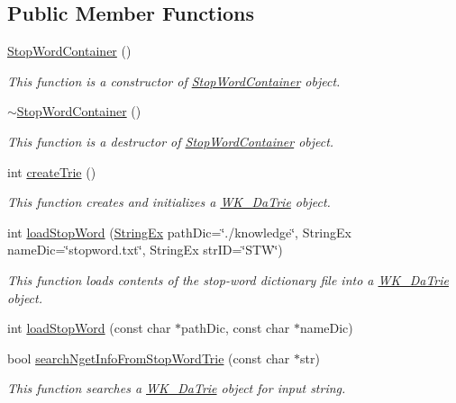 \subsection*{Public Member Functions}
\begin{CompactItemize}
\item 
\hyperlink{classkmaOrange_1_1StopWordContainer_7356fb7080dee806d788624b8a247dba}{StopWordContainer} ()
\begin{CompactList}\small\item\em This function is a constructor of \hyperlink{classkmaOrange_1_1StopWordContainer}{StopWordContainer} object. \item\end{CompactList}\item 
\hyperlink{classkmaOrange_1_1StopWordContainer_853fda3c028335f2529c57e0341f22fd}{$\sim$StopWordContainer} ()
\begin{CompactList}\small\item\em This function is a destructor of \hyperlink{classkmaOrange_1_1StopWordContainer}{StopWordContainer} object. \item\end{CompactList}\item 
int \hyperlink{classkmaOrange_1_1StopWordContainer_143f32eb2e3b314d596cbd30f7ed6cfd}{createTrie} ()
\begin{CompactList}\small\item\em This function creates and initializes a \hyperlink{classkmaOrange_1_1WK__DaTrie}{WK\_\-DaTrie} object. \item\end{CompactList}\item 
int \hyperlink{classkmaOrange_1_1StopWordContainer_653df376c7907c3d6e87d77a223cd271}{loadStopWord} (\hyperlink{classStringEx}{StringEx} pathDic=\char`\"{}./knowledge\char`\"{}, StringEx nameDic=\char`\"{}stopword.txt\char`\"{}, StringEx strID=\char`\"{}STW\char`\"{})
\begin{CompactList}\small\item\em This function loads contents of the stop-word dictionary file into a \hyperlink{classkmaOrange_1_1WK__DaTrie}{WK\_\-DaTrie} object. \item\end{CompactList}\item 
int \hyperlink{classkmaOrange_1_1StopWordContainer_ab4a54069abd335d64dd34d6f194b1a2}{loadStopWord} (const char $\ast$pathDic, const char $\ast$nameDic)
\item 
bool \hyperlink{classkmaOrange_1_1StopWordContainer_a2bd1c44212a17f7ae12de9287860ad1}{searchNgetInfoFromStopWordTrie} (const char $\ast$str)
\begin{CompactList}\small\item\em This function searches a \hyperlink{classkmaOrange_1_1WK__DaTrie}{WK\_\-DaTrie} object for input string. \item\end{CompactList}\end{CompactItemize}
